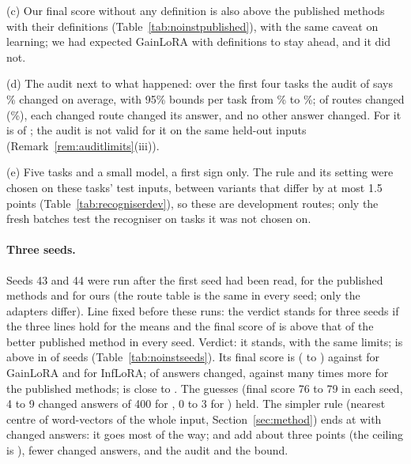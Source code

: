 (c) Our final score without any definition is also above the published methods with their definitions (Table~\ref{tab:noinstpublished}), with the same caveat on learning; we had expected GainLoRA with definitions to stay ahead, and it did not.

(d) The audit next to what happened: over the first four tasks the audit of \recog{} says \AudRouteFiveRidgeFirstFourAuditEst{}\% changed on average, with 95\% bounds per task from \AudRouteFiveRidgeFirstFourBoundLow{}\% to \AudRouteFiveRidgeFirstFourBoundHigh{}\%; \AudRouteFiveRidgeChanged{} of \AudRouteFiveRidgeCompared{} routes changed (\AudRouteFiveRidgeChangedShare{}\%), each changed route changed its answer, and no other answer changed. For \handicap{} it is \AudRouteFiveHandicapChanged{} of \AudRouteFiveHandicapCompared{}; the audit is not valid for it on the same held-out inputs (Remark~\ref{rem:auditlimits}(iii)).

(e) Five tasks and a small model, a first sign only. The rule and its setting were chosen on these tasks' test inputs, between variants that differ by at most 1.5 points (Table~\ref{tab:recogniserdev}), so these are development routes; only the fresh batches test the recogniser on tasks it was not chosen on.

\paragraph{Three seeds.} Seeds 43 and 44 were run after the first seed had been read, for the published methods and for ours (the route table is the same in every seed; only the adapters differ).
Line fixed before these runs: the verdict stands for three seeds if the three lines hold for the means and the final score of \recog{} is above that of the better published method in every seed. Verdict: it stands, with the same limits; \recog{} is above in \AudSeedsRidgeAboveInAll{} of \AudSeedsN{} seeds (Table~\ref{tab:noinstseeds}). Its final score is \AudSeedsRidgeAP{} (\AudSeedsRidgeAPLow{} to \AudSeedsRidgeAPHigh{}) against \AudSeedsGainloraAP{} for GainLoRA and \AudSeedsInfloraAP{} for InfLoRA; \AudSeedsRidgeChanged{} of \AudSeedsCompared{} answers changed, against many times more for the published methods; \handicap{} is close to \recog{}.
The guesses (final score 76 to 79 in each seed, 4 to 9 changed answers of 400 for \recog{}, 0 to 3 for \handicap{}) held. The simpler rule \centre{} (nearest centre of word-vectors of the whole input, Section~\ref{sec:method}) ends at \AudSeedsCentreAP{} with \AudSeedsCentreChanged{} changed answers: it goes most of the way; \recog{} and \handicap{} add about three points (the ceiling is \AudSeedsOwnAP{}), fewer changed answers, and the audit and the bound.

